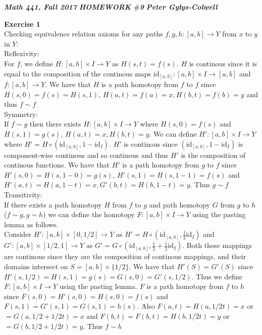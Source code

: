 \documentclass[12pt]{article}
\newenvironment{ques}[1]{\textbf{Exercise #1}\vspace{1 mm}\\ }{\bigskip}
\theoremstyle{definition}
\newcommand{\id}{\text{id}}
\begin{document}
\noindent \textit{\textbf{Math 441, Fall 2017}} \hspace{1.3cm}
\textit{\textbf{HOMEWORK $\#$9}} \hspace{1.3cm} \textit{\textbf{Peter
Gylys-Colwell}} 

\vspace{1cm}


\begin{ques}{1}
	Checking equivalence relation axioms for any paths $f, g, h : [a,b] \to Y$
	from $x$ to $y$ in $Y$:\\
	Reflexivity:\\
	For $f$, we define $H : [a,b] \times I \to Y$ as $H(s,t) = f(s)$. $H$ is
	continous since it is equal to the composition of the continous maps
	$\id_{[a,b]} : {[a,b]} \times I \to {[a,b]}$ and $f: {[a,b]} \to Y$. We
	have that $H$ is a path homotopy from $f$ to $f$ since $H(s,0) = f(s) =
	H(s,1)$, $H(a,t) = f(a) = x, H(b,t) = f(b) = y$ and thus $f \sim f$\\
	Symmetry:\\
	If $f \sim g$ then there exists $H: {[a,b]} \times I \to Y$ where $H(s,0) =
	f(s)$ and $H(s,1) = g(s)$, $H(a,t) = x, H(b,t) = y$. We can define $H':
	{[a,b]} \times I \to Y$ where $H' = H \circ (\id_{[a,b]}, 1 -\id_I)$. $H'$
	is continous since $(\id_{[a,b]}, 1 - \id_I)$ is component-wise continous
	and so continous and thus $H'$ is the composition of continous functions.
	We have that $H'$ is a path homotopy from $g$ to $f$ since $H'(s,0) = H(s,1
	- 0) = g(s)$, $H'(s,1) = H(s,1-1) = f(s)$ and $H'(a,t) = H(a,1-t) = x,
	G'(b,t) = H(b,1-t) = y$. Thus $g \sim f$\\
	Transitivity:\\
	If there exists a path homotopy $H$ from $f$ to $g$ and path homotopy $G$
	from $g$ to $h$ ($f \sim g, g \sim h$) we can define the homotopy
	$F:{[a,b]} \times I \to Y$ using the pasting lemma as follows.\\ Consider
	$H':{[a,b]} \times [0,1/2] \to Y$ as $H' = H \circ (\id_{[a,b]}, \frac 1
	2\id_I)$ and $G': {[a,b]} \times [1/2, 1] \to Y$ as $G' = G \circ
	(\id_{[a,b]}, \frac 1 2 + \frac 1 2 \id_I)$. Both these mappings are
	continous since they are the composition of continous mappings, and their
	domains intersect on $S = {[a,b]} \times \{1/2\}$. We have that $H'(S) =
	G'(S)$ since $H'(s,1/2) = H(s,1) = g(s) = G(s,0) = G'(s,1/2)$. Thus we
	define $F: {[a,b]} \times I \to Y$ using the pasting lemma. $F$ is a
	path homotopy from $f$ to $h$ since $F(s,0) = H'(s,0) = H(s,0) = f(s)$ and
	$F(s,1) = G'(s,1) = G(s,1) = h(s)$. Also $F(a,t) = H(a,1/2 t) = x$ or $=
	G(a,1/2 + 1/2 t) = x$ and $F(b,t) = F(b,t) = H(b,1/2 t) = y$ or $= G(b,1/2
	+ 1/2 t) = y$. Thus $f \sim h$
\end{ques}
\end{document}
